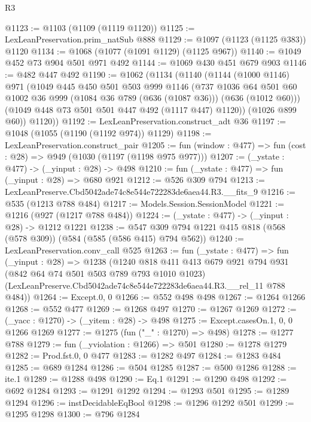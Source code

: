 \begin{lexlean}{R3}
\begin{coremodule}
@1123 := @1103 (@1109 (@1119 @1120))
@1125 := LexLeanPreservation.prim_natSub @888
@1129 := @1097 (@1123 (@1125 @383)) @1120
@1134 := @1068 (@1077 (@1091 @1129) (@1125 @967))
@1140 := @1049 @452 @73 @904 @501 @971 @492
@1144 := @1069 @430 @451 @679 @903
@1146 := @482 @447 @492
@1190 := @1062
    (@1134
      (@1140
        (@1144
          (@1000 @1146)
          @971
          (@1049
            @445
            @450
            @501
            @503
            @999
            @1146
            (@737
              @1036
              @64
              @501
              @60
              @1002
              @36
              @999
              (@1084 @36 @789 (@636 (@1087 @36)))
              (@636 (@1012 @60)))
            (@1049 @448 @73 @501 @501 @447 @492 (@1117 @447) @1120))
          (@1026 @899 @60))
        @1120))
@1192 := LexLeanPreservation.construct_adt @36
@1197 := @1048 (@1055 (@1190 (@1192 @974)) @1129)
@1198 := LexLeanPreservation.construct_pair
@1205 := fun (window : @477) => fun (cost : @28) => @949 (@1030 (@1197 (@1198 @975 @977)))
@1207 := (_ystate : @477) -> (_yinput : @28) -> @498
@1210 := fun (_ystate : @477) => fun (_yinput : @28) => @680 @921
@1212 := @526 @309 @794
@1213 := LexLeanPreserve.Cbd5042ade74c8e544e722283de6aea44.R3.__fits_9
@1216 := @535 (@1213 @788 @484)
@1217 := Models.Session.SessionModel
@1221 := @1216 (@927 (@1217 @788 @484))
@1224 := (_ystate : @477) -> (_yinput : @28) -> @1212 @1221
@1238 := @547 @309 @794 @1221 @415 @818 (@568 (@578 @309)) (@584 (@585 (@586 @415) @794 @562))
@1240 := LexLeanPreservation.conv_call @525
@1263 := fun (_ystate : @477) =>
  fun (_yinput : @28) =>
  @1238
    (@1240
      @818
      @411
      @413
      @679
      @921
      @794
      @931
      (@842 @64 @74 @501 @503 @789 @793 @1010 @1023)
      (LexLeanPreserve.Cbd5042ade74c8e544e722283de6aea44.R3.__rel_11 @788 @484))
@1264 := Except.{0, 0}
@1266 := @552 @498 @498
@1267 := @1264 @1266
@1268 := @552 @477
@1269 := @1268 @497
@1270 := @1267 @1269
@1272 := (_yacc : @1270) -> (_yitem : @28) -> @498
@1275 := Except.casesOn.{1, 0, 0} @1266 @1269
@1277 := @1275 (fun ("_" : @1270) => @498)
@1278 := @1277 @788
@1279 := fun (_yviolation : @1266) => @501
@1280 := @1278 @1279
@1282 := Prod.fst.{0, 0} @477
@1283 := @1282 @497
@1284 := @1283 @484
@1285 := @689 @1284
@1286 := @504 @1285
@1287 := @500 @1286
@1288 := ite.{1}
@1289 := @1288 @498
@1290 := Eq.{1}
@1291 := @1290 @498
@1292 := @692 @1284
@1293 := @1291 @1292
@1294 := @1293 @501
@1295 := @1289 @1294
@1296 := instDecidableEqBool
@1298 := @1296 @1292 @501
@1299 := @1295 @1298
@1300 := @796 @1284

\end{coremodule}
\end{lexlean}
